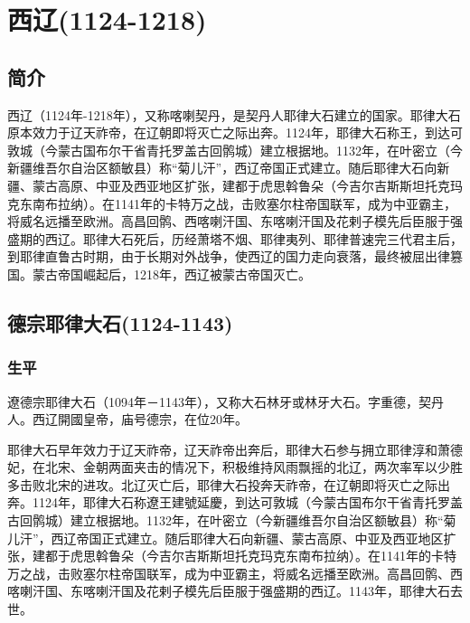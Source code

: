 
\section{西辽\tiny(1124-1218)}

\subsection{简介}

西辽（1124年-1218年），又称喀喇契丹，是契丹人耶律大石建立的国家。耶律大石原本效力于辽天祚帝，在辽朝即将灭亡之际出奔。1124年，耶律大石称王，到达可敦城（今蒙古国布尔干省青托罗盖古回鹘城）建立根据地。1132年，在叶密立（今新疆维吾尔自治区额敏县）称“菊儿汗”，西辽帝国正式建立。随后耶律大石向新疆、蒙古高原、中亚及西亚地区扩张，建都于虎思斡鲁朵（今吉尔吉斯斯坦托克玛克东南布拉纳）。在1141年的卡特万之战，击败塞尔柱帝国联军，成为中亚霸主，将威名远播至欧洲。高昌回鹘、西喀喇汗国、东喀喇汗国及花剌子模先后臣服于强盛期的西辽。耶律大石死后，历经萧塔不烟、耶律夷列、耶律普速完三代君主后，到耶律直鲁古时期，由于长期对外战争，使西辽的国力走向衰落，最终被屈出律篡国。蒙古帝国崛起后，1218年，西辽被蒙古帝国灭亡。

\subsection{德宗耶律大石\tiny(1124-1143)}

\subsubsection{生平}

遼德宗耶律大石（1094年－1143年），又称大石林牙或林牙大石。字重德，契丹人。西辽開國皇帝，庙号德宗，在位20年。

耶律大石早年效力于辽天祚帝，辽天祚帝出奔后，耶律大石参与拥立耶律淳和萧德妃，在北宋、金朝两面夹击的情况下，积极维持风雨飘摇的北辽，两次率军以少胜多击败北宋的进攻。北辽灭亡后，耶律大石投奔天祚帝，在辽朝即将灭亡之际出奔。1124年，耶律大石称遼王建號延慶，到达可敦城（今蒙古国布尔干省青托罗盖古回鹘城）建立根据地。1132年，在叶密立（今新疆维吾尔自治区额敏县）称“菊儿汗”，西辽帝国正式建立。随后耶律大石向新疆、蒙古高原、中亚及西亚地区扩张，建都于虎思斡鲁朵（今吉尔吉斯斯坦托克玛克东南布拉纳）。在1141年的卡特万之战，击败塞尔柱帝国联军，成为中亚霸主，将威名远播至欧洲。高昌回鹘、西喀喇汗国、东喀喇汗国及花剌子模先后臣服于强盛期的西辽。1143年，耶律大石去世。

